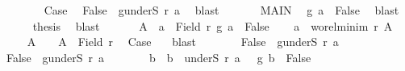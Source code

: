 \begin{isabellebody}
\ \ \ \ \ \isamarkupfalse%
\ {}\ Case\ \isamarkupfalse%
\ {\isachardoublequoteopen}False\ {\isasymin}\ g{\isacharbackquote}{\kern0pt}{\isacharparenleft}{\kern0pt}underS\ r\ a{\isacharparenright}{\kern0pt}{\isachardoublequoteclose}\ \isamarkupfalse%
\ blast\isanewline
\ \ \ \ \ \isamarkupfalse%
\ MAIN{}\ \isamarkupfalse%
\ {\isachardoublequoteopen}g\ a\ {\isacharequal}{\kern0pt}\ False{\isachardoublequoteclose}\ \isamarkupfalse%
\ blast\isacommand{{\isacharbraceright}{\kern0pt}}\isamarkupfalse%
\isanewline
\ \ \ \ \isamarkupfalse%
\ {\isacharquery}{\kern0pt}thesis\ \isamarkupfalse%
\ blast\isanewline
\ \ \isamarkupfalse%
\isanewline
\ \ \isamarkupfalse%
\ {\isacharquery}{\kern0pt}A\ {\isacharequal}{\kern0pt}\ {\isachardoublequoteopen}{\isacharbraceleft}{\kern0pt}a\ {\isasymin}\ Field\ r{\isachardot}{\kern0pt}\ g\ a\ {\isacharequal}{\kern0pt}\ False{\isacharbraceright}{\kern0pt}{\isachardoublequoteclose}\isanewline
\ \ \isamarkupfalse%
\ {\isacharquery}{\kern0pt}a\ {\isacharequal}{\kern0pt}\ {\isachardoublequoteopen}{\isacharparenleft}{\kern0pt}wo{\isacharunderscore}{\kern0pt}rel{\isachardot}{\kern0pt}minim\ r\ {\isacharquery}{\kern0pt}A{\isacharparenright}{\kern0pt}{\isachardoublequoteclose}\isanewline
\ \ \isanewline
\ \ \isamarkupfalse%
\ {}{\isacharcolon}{\kern0pt}\ {\isachardoublequoteopen}{\isacharquery}{\kern0pt}A\ {\isasymnoteq}\ {\isacharbraceleft}{\kern0pt}{\isacharbraceright}{\kern0pt}\ {\isasymand}\ {\isacharquery}{\kern0pt}A\ {\isasymle}\ Field\ r{\isachardoublequoteclose}\ \isamarkupfalse%
\ Case\ {}\ \isamarkupfalse%
\ blast\isanewline
\ \ \isanewline
\ \ \isamarkupfalse%
\ {}{\isacharcolon}{\kern0pt}\ {\isachardoublequoteopen}False\ {\isasymnotin}\ g{\isacharbackquote}{\kern0pt}{\isacharparenleft}{\kern0pt}underS\ r\ {\isacharquery}{\kern0pt}a{\isacharparenright}{\kern0pt}{\isachardoublequoteclose}\isanewline
\ \ \isamarkupfalse%
\isanewline
\ \ \ \ \isamarkupfalse%
\ {\isachardoublequoteopen}False\ {\isasymin}\ g{\isacharbackquote}{\kern0pt}{\isacharparenleft}{\kern0pt}underS\ r\ {\isacharquery}{\kern0pt}a{\isacharparenright}{\kern0pt}{\isachardoublequoteclose}\isanewline
\ \ \ \ \isamarkupfalse%
\ \isamarkupfalse%
\ b\ \ {\isachardoublequoteopen}b\ {\isasymin}\ underS\ r\ {\isacharquery}{\kern0pt}a{\isachardoublequoteclose}\ \ {}{}{\isacharcolon}{\kern0pt}\ {\isachardoublequoteopen}g\ b\ {\isacharequal}{\kern0pt}\ False{\isachardoublequoteclose}\ \isamarkupfalse%

\end{isabellebody}
